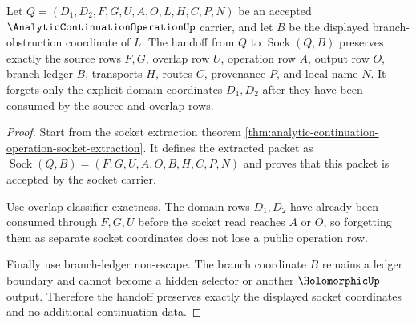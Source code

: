 \begin{theorem}
\label{thm:analytic-continuation-operation-socket-handoff-exactness}
Let $Q=(D_1,D_2,F,G,U,A,O,L,H,C,P,N)$ be an accepted $\AnalyticContinuationOperationUp$ carrier, and let $B$ be the displayed branch-obstruction coordinate of $L$. The handoff from $Q$ to $\operatorname{Sock}(Q,B)$ preserves exactly the source rows $F,G$, overlap row $U$, operation row $A$, output row $O$, branch ledger $B$, transports $H$, routes $C$, provenance $P$, and local name $N$. It forgets only the explicit domain coordinates $D_1,D_2$ after they have been consumed by the source and overlap rows.
\end{theorem}
\begin{proof}
Start from the socket extraction theorem \autoref{thm:analytic-continuation-operation-socket-extraction}. It defines the extracted packet as $\operatorname{Sock}(Q,B)=(F,G,U,A,O,B,H,C,P,N)$ and proves that this packet is accepted by the socket carrier.

Use overlap classifier exactness. The domain rows $D_1,D_2$ have already been consumed through $F,G,U$ before the socket read reaches $A$ or $O$, so forgetting them as separate socket coordinates does not lose a public operation row.

Finally use branch-ledger non-escape. The branch coordinate $B$ remains a ledger boundary and cannot become a hidden selector or another $\HolomorphicUp$ output. Therefore the handoff preserves exactly the displayed socket coordinates and no additional continuation data.
\end{proof}

